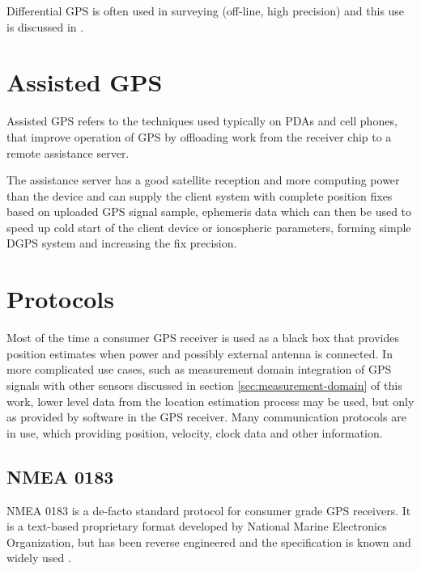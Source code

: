 Differential GPS is often used in surveying (off-line, high precision) and this
use is discussed in \cite{rizos99}.

\section{Assisted GPS}
Assisted GPS refers to the techniques used typically on PDAs and cell phones, that improve operation of GPS by offloading
work from the receiver chip to a remote assistance server.

The assistance server has a good satellite reception and more computing power than the device
and can supply the client system with complete position fixes based on uploaded GPS signal sample,
ephemeris data which can then be used to speed up cold start of the client device or
ionospheric parameters, forming simple DGPS system and increasing the fix precision.



\section{Protocols}
Most of the time a consumer GPS receiver is used as a black box that provides position
estimates when power and possibly external antenna is connected.
In more complicated use cases, such as measurement domain integration of GPS signals with
other sensors discussed in section \ref{sec:measurement-domain} of this work,
lower level data from the location estimation process may be used, but only as provided
by software in the GPS receiver.
Many communication protocols are in use, which providing position, velocity, clock data
and other information.

\subsection{NMEA 0183}
NMEA 0183 is a de-facto standard protocol for consumer grade GPS receivers.
It is a text-based proprietary format developed by National Marine Electronics Organization,
but has been reverse engineered and the specification is known and widely used \cite{depriest}.


